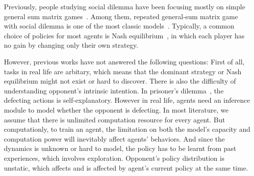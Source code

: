 \documentclass{article}
\begin{document}
Previously, people studying social dilemma have been focusing mostly on simple general sum matrix games~\cite{tullock1974social}.
Among them, repeated general-sum matrix game with social dilemma is one of the most classic models~\cite{bouzy2010multi, leibo2017multi}.
Typically, a common choice of policies for most agents is Nash equilibrium~\cite{maskin1999Nash, tullock1974social, bouzy2010multi},
in which each player has no gain by changing only their own strategy.

However, previous works have not answered the following questions:
First of all, tasks in real life are arbitary, which means that
the dominant strategy or Nash equilibrium might not exist or hard to discover.
There is also the difficulty of understanding opponent's intrinsic intention.
In prisoner's dilemma~\cite{nowak1993strategy}, the defecting actions is self-explanatory.
However in real life, agents need an inference module to model whether the opponent is defecting.
In most literature, we assume that there is unlimited computation resource for every agent.
But computationly, to train an agent,
the limitation on both the model's capacity and computation power will inevitably affect agents' behaviors.
And since the dynamics is unknown or hard to model,
the policy has to be learnt from past experiences, which involves exploration.
Opponent's policy distribution is unstatic,
which affects and is affected by agent's current policy at the same time.
\end{document}
